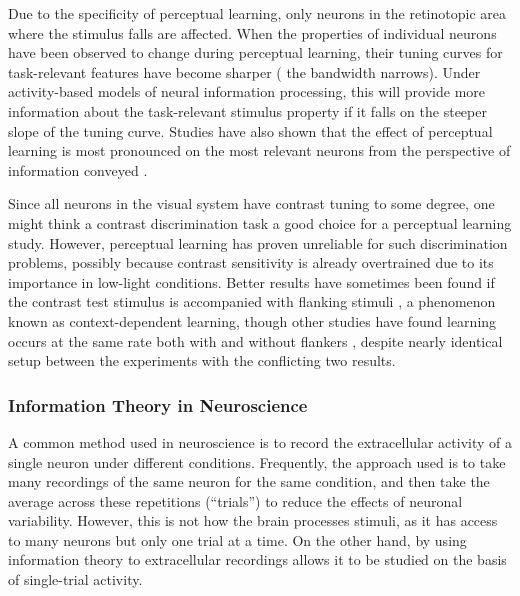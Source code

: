 Due to the specificity of perceptual learning, only neurons in the retinotopic area where the stimulus falls are affected. 
When the properties of individual neurons have been observed to change during perceptual learning, their tuning curves for task-relevant features have become sharper (\ie{} the bandwidth narrows). Under activity-based models of neural information processing, this will provide more information about the task-relevant stimulus property if it falls on the steeper slope of the tuning curve. Studies have also shown that the effect of perceptual learning is most pronounced on the most relevant neurons from the perspective of information conveyed \cite{Raiguel2006}. 


Since all neurons in the visual system have contrast tuning to some degree, one might think a contrast discrimination task a good choice for a perceptual learning study. However, perceptual learning has proven unreliable for such discrimination problems, possibly because contrast sensitivity is already overtrained due to its importance in low-light conditions. Better results have sometimes been found if the contrast test stimulus is accompanied with flanking stimuli \cite{Adini2002}, a phenomenon known as context-dependent learning, though other studies have found learning occurs at the same rate both with and without flankers \cite{Yu2004}, despite nearly identical setup between the experiments with the conflicting two results.

\subsubsection{Information Theory in Neuroscience}
\label{sec:bgit}

A common method used in neuroscience is to record the extracellular activity of a single neuron under different conditions. Frequently, the approach used is to take many recordings of the same neuron for the same condition, and then take the average across these repetitions (``trials'') to reduce the effects of neuronal variability. However, this is not how the brain processes stimuli, as it has access to many neurons but only one trial at a time.
On the other hand, by using information theory to extracellular recordings allows it to be studied on the basis of single-trial activity.

